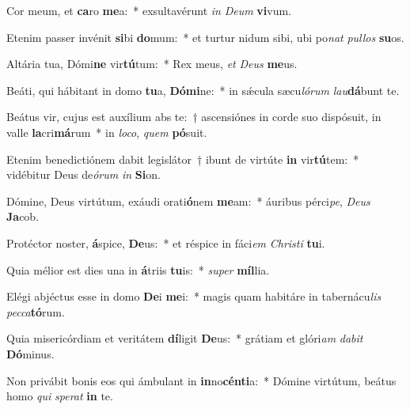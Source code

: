 \item Cor meum, et \textbf{ca}ro \textbf{me}a:~* exsultavérunt \textit{in} \textit{De}\textit{um} \textbf{vi}vum.
\item Etenim passer invénit \textbf{si}bi \textbf{do}mum:~* et turtur nidum sibi, ubi po\textit{nat} \textit{pul}\textit{los} \textbf{su}os.
\item Altária tua, Dómi\textbf{ne} vir\textbf{tú}tum:~* Rex meus, \textit{et} \textit{De}\textit{us} \textbf{me}us.
\item Beáti, qui hábitant in domo \textbf{tu}a, \textbf{Dó}\textbf{mi}ne:~* in sǽcula sæcu\textit{ló}\textit{rum} \textit{lau}\textbf{dá}bunt te.
\item Beátus vir, cujus est auxílium abs te:~† ascensiónes in corde suo dispósuit, in valle \textbf{la}cri\textbf{má}rum~* in \textit{lo}\textit{co}, \textit{quem} \textbf{pó}suit.
\item Etenim benedictiónem dabit legislátor~† ibunt de virtúte \textbf{in} vir\textbf{tú}tem:~* vidébitur Deus de\textit{ó}\textit{rum} \textit{in} \textbf{Si}on.
\item Dómine, Deus virtútum, exáudi orati\textbf{ó}nem \textbf{me}am:~* áuribus pérci\textit{pe}, \textit{De}\textit{us} \textbf{Ja}cob.
\item Protéctor noster, \textbf{á}spice, \textbf{De}us:~* et réspice in fáci\textit{em} \textit{Chris}\textit{ti} \textbf{tu}i.
\item Quia mélior est dies una in \textbf{á}triis \textbf{tu}is:~* \textit{su}\textit{per} \textbf{míl}lia.
\item Elégi abjéctus esse in domo \textbf{De}i \textbf{me}i:~* magis quam habitáre in tabernácu\textit{lis} \textit{pec}\textit{ca}\textbf{tó}rum.
\item Quia misericórdiam et veritátem \textbf{dí}ligit \textbf{De}us:~* grátiam et glóri\textit{am} \textit{da}\textit{bit} \textbf{Dó}minus.
\item Non privábit bonis eos qui ámbulant in \textbf{in}no\textbf{cén}\textbf{ti}a:~* Dómine virtútum, beátus homo \textit{qui} \textit{spe}\textit{rat} \textbf{in} te.
